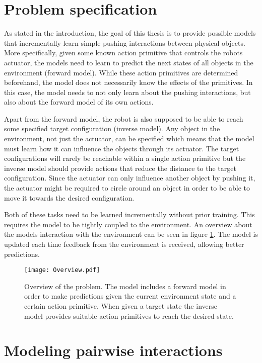 \section{Problem specification \label{sec:problem}}

As stated in the introduction, the goal of this thesis is to provide possible models that incrementally learn simple pushing interactions between physical objects. 
More specifically, given some known action primitive that controls the robots actuator, the models need to learn to predict the next states of all objects in the environment (forward model). 
While these action primitives are determined beforehand, the model does not necessarily know the effects of the primitives. In this case, the model needs to not only learn about the pushing interactions, but also about the forward model of its own actions.

Apart from the forward model, the robot is also supposed to be able to reach some specified target configuration (inverse model). Any object in the environment, not just the actuator, can be specified which means that the model must learn how it can influence the objects through its actuator. The target configurations will rarely be reachable within a single action primitive but the inverse model should provide actions that reduce the distance to the target configuration. Since the actuator can only influence another object by pushing it, the actuator might be required to circle around an object in order to be able to move it towards the desired configuration. 

Both of these tasks need to be learned incrementally without prior training. This requires the model to be tightly coupled to the environment. An overview about the models interaction with the environment can be seen in figure \ref{fig:overview}. The model is updated each time feedback from the environment is received, allowing better predictions.


\begin{figure}
	\centering
	\texttt{[image: Overview.pdf]}
	\caption{Overview of the problem. The model includes a forward model in order to make predictions given the current environment state and a certain action primitive. When given a target state the inverse model provides suitable action primitives to reach the desired state.}
	\label{fig:overview}
\end{figure}

\section{Modeling pairwise interactions \label{sec:pairInt}}

